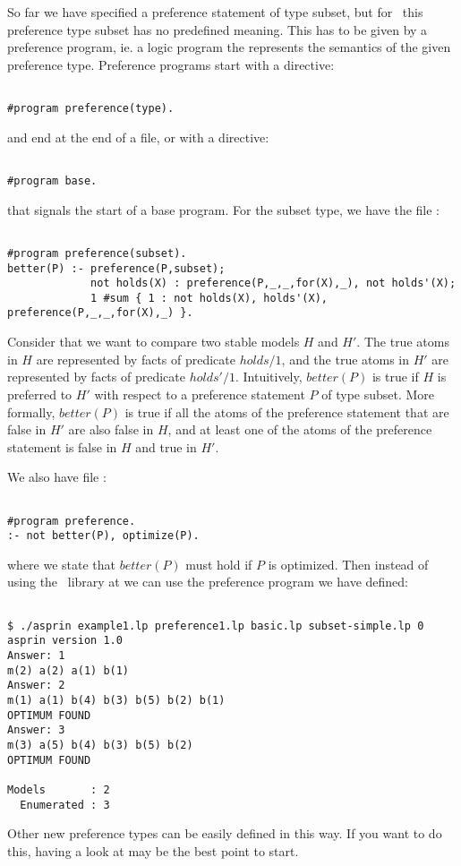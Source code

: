 So far we have specified a preference statement of type subset, 
but for \asprin\ this preference type subset has no predefined meaning. 
This has to be given by a preference program,  ie. a logic program the represents the semantics of the given preference type. 
Preference programs start with a directive: 
\begin{lstlisting}[numbers=none]

#program preference(type).
\end{lstlisting}
and end at the end of a file, or with a directive:  
\begin{lstlisting}[numbers=none]

#program base.
\end{lstlisting}
that signals the start of a base program. For the subset type, we have the file : 
\begin{lstlisting}[numbers=none]

#program preference(subset).
better(P) :- preference(P,subset);
             not holds(X) : preference(P,_,_,for(X),_), not holds'(X);
             1 #sum { 1 : not holds(X), holds'(X), preference(P,_,_,for(X),_) }.
\end{lstlisting}
Consider that we want to compare two stable models $H$ and $H'$. 
The true atoms in $H$ are represented by facts of predicate $holds/1$,  and the true atoms in $H'$ are represented by facts of predicate $holds'/1$. 
Intuitively, $better(P)$ is true if $H$ is preferred to $H'$ with respect to a preference statement $P$ of type subset. 
More formally, $better(P)$ is true if all the atoms of the preference statement that are false in $H'$ are also false in $H$,  
and at least one of the atoms of the preference statement is false in $H$ and true in $H'$. 

We also have file : 
\begin{lstlisting}[numbers=none]

#program preference.
:- not better(P), optimize(P).
\end{lstlisting}
where we state that $better(P)$ must hold if $P$ is optimized. 
Then instead of using the \asprin\ library at  we can use the preference program we have defined: 
\begin{lstlisting}[numbers=none]

$ ./asprin example1.lp preference1.lp basic.lp subset-simple.lp 0
asprin version 1.0
Answer: 1
m(2) a(2) a(1) b(1)
Answer: 2
m(1) a(1) b(4) b(3) b(5) b(2) b(1)
OPTIMUM FOUND
Answer: 3
m(3) a(5) b(4) b(3) b(5) b(2)
OPTIMUM FOUND

Models       : 2
  Enumerated : 3

\end{lstlisting}
Other new preference types can be easily defined in this way.  
If you want to do this, having a look at  may be the best point to start. 

\iffalse
\fi

